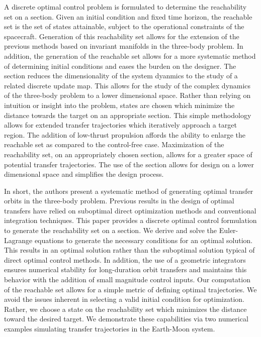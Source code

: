 \documentclass[preprint]{elsarticle}
\begin{document}
A discrete optimal control problem is formulated to determine the reachability set on a \Poincare section.
Given an initial condition and fixed time horizon, the reachable set is the set of states attainable, subject to the operational constraints of the spacecraft. 
Generation of this reachability set allows for the extension of the previous methods based on invariant manifolds in the three-body problem.
In addition, the generation of the reachable set allows for a more systematic method of determining initial conditions and eases the burden on the designer. 
The \Poincare section reduces the dimensionality of the system dyanmics to the study of a related discrete update map.  
This allows for the study of the complex dynamics of the three-body problem to a lower dimensional space.
Rather than relying on intuition or insight into the problem, states are chosen which minimize the distance towards the target on an appropriate \Poincare section.
This simple methodology allows for extended transfer trajectories which iteratively approach a target region.
The addition of low-thrust propulsion affords the ability to enlarge the reachable set as compared to the control-free case.
Maximization of the reachability set, on an appropriately chosen \Poincare section, allows for a greater space of potential transfer trajectories.
The use of the \Poincare section allows for design on a lower dimensional space and simplifies the design process.

In short, the authors present a systematic method of generating optimal transfer orbits in the three-body problem.
Previous results in the design of optimal transfers have relied on suboptimal direct optimization methods and conventional integration techniques.
This paper provides a discrete optimal control formulation to generate the reachability set on a \Poincare section.
We derive and solve the Euler-Lagrange equations to generate the necessary conditions for an optimal solution.
This results in an optimal solution rather than the suboptimal solution typical of direct optimal control methods.
In addition, the use of a geometric integrators ensures numerical stability for long-duration orbit transfers and maintains this behavior with the addition of small magnitude control inputs.
Our computation of the reachable set allows for a simple metric of defining optimal trajectories.
We avoid the issues inherent in selecting a valid initial condition for optimization.
Rather, we choose a state on the reachability set which minimizes the distance toward the desired target.
We demonstrate these capabilities via two numerical examples simulating transfer trajectories in the Earth-Moon system.
\end{document}
